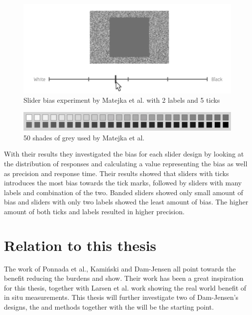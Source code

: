 \begin{figure}[h!]
    \centering
    \includegraphics[width=1\textwidth]{figures/mate_ex.png}
    \caption{Slider bias experiment by Matejka et al.\cite{grey} with 2 labels and 5 ticks}
    \label{mate_ex}
\end{figure}

\begin{figure}[h!]
    \centering
    \includegraphics[width=1\textwidth]{figures/50shades.png}
    \caption{50 shades of grey used by Matejka et al.\cite{grey}}
    \label{50shades}
\end{figure}

With their results they investigated the bias for each slider design by looking at the distribution of responses and calculating a  value representing the bias as well as precision and response time. Their results showed that sliders with ticks introduces the most bias towards the tick marks, followed by sliders with many labels and combination of the two. Banded sliders showed only small amount of bias and sliders with only two labels showed the least amount of bias. The higher amount of both ticks and labels resulted in higher precision.

\section{Relation to this thesis}
The work of Ponnada et al., Kami\'nski and Dam-Jensen all point towards the benefit reducing the burdens and show. Their work has been a great inspiration for this thesis, together with Larsen et al. work showing the real world benefit of in situ measurements. This thesis will further investigate two of Dam-Jensen's designs, the  and  methods together with the  will be the starting point.